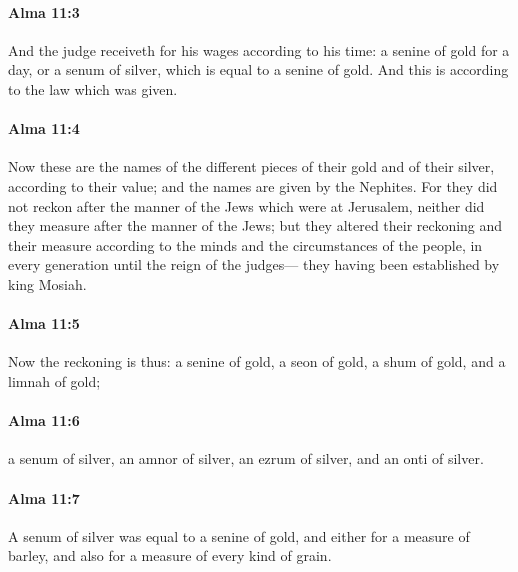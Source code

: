 		\paragraph{Alma 11:3} %
			\label{ALMA-11-3}

			And the judge receiveth for his wages according to his time:
			a senine of gold for a day,
			or a senum of silver, which is equal to a senine of gold.
			And this is according to the law which was given.

		\paragraph{Alma 11:4} %
			\label{ALMA-11-4}

			Now these are the names of the different pieces
			of their gold and of their silver, according to their value;
			and the names are given by the Nephites.
			For they did not reckon after the manner of the Jews which were at Jerusalem,
			neither did they measure after the manner of the Jews;
			but they altered their reckoning and their measure
			according to the minds and the circumstances of the people,
			in every generation until the reign of the judges---
			they having been established by king Mosiah.

		\paragraph{Alma 11:5} %
			\label{ALMA-11-5}

			Now the reckoning is thus:
			a senine of gold,
			a seon of gold,
			a shum of gold,
			and a limnah of gold;

		\paragraph{Alma 11:6} %
			\label{ALMA-11-6}

			a senum of silver,
			an amnor of silver,
			an ezrum of silver,
			and an onti of silver.

		\paragraph{Alma 11:7} %
			\label{ALMA-11-7}

			A senum of silver was equal to a senine of gold,
			and either for a measure of barley,
			and also for a measure of every kind of grain.

